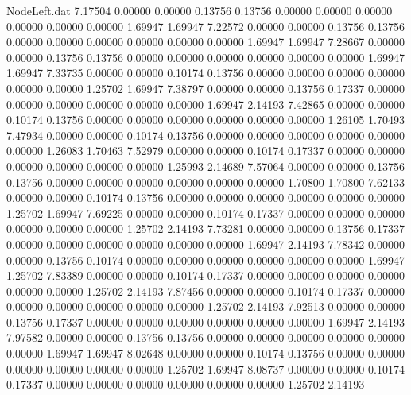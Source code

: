 \begin{filecontents}{NodeLeft.dat}
   7.17504    0.00000    0.00000     0.13756    0.13756    0.00000    0.00000    0.00000    0.00000    0.00000    0.00000    1.69947    1.69947
   7.22572    0.00000    0.00000     0.13756    0.13756    0.00000    0.00000    0.00000    0.00000    0.00000    0.00000    1.69947    1.69947
   7.28667    0.00000    0.00000     0.13756    0.13756    0.00000    0.00000    0.00000    0.00000    0.00000    0.00000    1.69947    1.69947
   7.33735    0.00000    0.00000     0.10174    0.13756    0.00000    0.00000    0.00000    0.00000    0.00000    0.00000    1.25702    1.69947
   7.38797    0.00000    0.00000     0.13756    0.17337    0.00000    0.00000    0.00000    0.00000    0.00000    0.00000    1.69947    2.14193
   7.42865    0.00000    0.00000     0.10174    0.13756    0.00000    0.00000    0.00000    0.00000    0.00000    0.00000    1.26105    1.70493
   7.47934    0.00000    0.00000     0.10174    0.13756    0.00000    0.00000    0.00000    0.00000    0.00000    0.00000    1.26083    1.70463
   7.52979    0.00000    0.00000     0.10174    0.17337    0.00000    0.00000    0.00000    0.00000    0.00000    0.00000    1.25993    2.14689
   7.57064    0.00000    0.00000     0.13756    0.13756    0.00000    0.00000    0.00000    0.00000    0.00000    0.00000    1.70800    1.70800
   7.62133    0.00000    0.00000     0.10174    0.13756    0.00000    0.00000    0.00000    0.00000    0.00000    0.00000    1.25702    1.69947
   7.69225    0.00000    0.00000     0.10174    0.17337    0.00000    0.00000    0.00000    0.00000    0.00000    0.00000    1.25702    2.14193
   7.73281    0.00000    0.00000     0.13756    0.17337    0.00000    0.00000    0.00000    0.00000    0.00000    0.00000    1.69947    2.14193
   7.78342    0.00000    0.00000     0.13756    0.10174    0.00000    0.00000    0.00000    0.00000    0.00000    0.00000    1.69947    1.25702
   7.83389    0.00000    0.00000     0.10174    0.17337    0.00000    0.00000    0.00000    0.00000    0.00000    0.00000    1.25702    2.14193
   7.87456    0.00000    0.00000     0.10174    0.17337    0.00000    0.00000    0.00000    0.00000    0.00000    0.00000    1.25702    2.14193
   7.92513    0.00000    0.00000     0.13756    0.17337    0.00000    0.00000    0.00000    0.00000    0.00000    0.00000    1.69947    2.14193
   7.97582    0.00000    0.00000     0.13756    0.13756    0.00000    0.00000    0.00000    0.00000    0.00000    0.00000    1.69947    1.69947
   8.02648    0.00000    0.00000     0.10174    0.13756    0.00000    0.00000    0.00000    0.00000    0.00000    0.00000    1.25702    1.69947
   8.08737    0.00000    0.00000     0.10174    0.17337    0.00000    0.00000    0.00000    0.00000    0.00000    0.00000    1.25702    2.14193

\end{filecontents}

